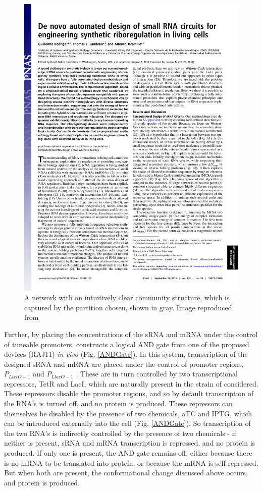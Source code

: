 \documentclass[10pt,journal]{./IEEE_latex_class/IEEEtran}
\begin{document}
\begin{figure}[H]
\centering
\includegraphics[trim = 60 630 300 30,page=2,clip = true]{pnas1203831109.pdf}
\caption{A network with an intuitively clear community structure, which is captured by the partition chosen, shown in gray. Image reproduced from \cite{Rodrigo2012}}
\label{reactionscheme}
\end{figure}


Further, by placing the concentrations of the sRNA and mRNA under the control of tuneable promoters, \cite{Rodrigo2012} constructs a logical AND gate from one of the proposed devices (RAJ11) \textit{in vivo} (Fig. \ref{ANDGate}). In this system, transcription of the designed sRNA and mRNA are placed under the control of promoter regions, $P_{LtetO-1}$ and $P_{LlacO-1}$ \cite{Lutz1997}. These are in turn controlled by two transcriptional repressors, TetR and LacI, which are naturally present in the strain of  considered. These repressors disable the promoter regions, and so by default transcription of the RNA's is turned off, and no protein is produced. 
These repressors can themselves be disabled by the presence of two chemicals, aTC and IPTG, which can be introduced externally into the cell (Fig. \ref{ANDGate}).  So transcription of the two RNA's is indirectly controlled by the presence of two chemicals - if neither is present, sRNA and mRNA transcription is repressed, and no protein is produced. If only one is present, the AND gate remains off, either because there is no mRNA to be translated into protein, or because the mRNA is self repressed. But when both are present, the conformational change discussed above occurs, and protein is produced.
\end{document}

